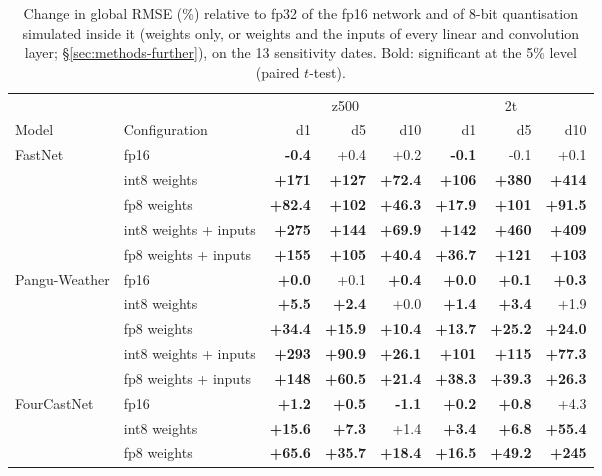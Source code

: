 \begin{table}[tbp]
\centering
\scriptsize
\setlength{\tabcolsep}{3pt}
\caption{Change in global RMSE (\%) relative to fp32 of the fp16 network and of 8-bit quantisation simulated inside it (weights only, or weights and the inputs of every linear and convolution layer; \S\ref{sec:methods-further}), on the 13 sensitivity dates. Bold: significant at the 5\% level (paired $t$-test).}
\label{tab:eightbit}
\begin{tabular}{llrrrrrr}
\toprule
 & & \multicolumn{3}{c}{z500} & \multicolumn{3}{c}{2t} \\
Model & Configuration & d1 & d5 & d10 & d1 & d5 & d10 \\
\midrule
FastNet & fp16 & \textbf{-0.4} & +0.4 & +0.2 & \textbf{-0.1} & -0.1 & +0.1 \\
 & int8 weights & \textbf{+171} & \textbf{+127} & \textbf{+72.4} & \textbf{+106} & \textbf{+380} & \textbf{+414} \\
 & fp8 weights & \textbf{+82.4} & \textbf{+102} & \textbf{+46.3} & \textbf{+17.9} & \textbf{+101} & \textbf{+91.5} \\
 & int8 weights + inputs & \textbf{+275} & \textbf{+144} & \textbf{+69.9} & \textbf{+142} & \textbf{+460} & \textbf{+409} \\
 & fp8 weights + inputs & \textbf{+155} & \textbf{+105} & \textbf{+40.4} & \textbf{+36.7} & \textbf{+121} & \textbf{+103} \\
\midrule
Pangu-Weather & fp16 & \textbf{+0.0} & +0.1 & \textbf{+0.4} & \textbf{+0.0} & \textbf{+0.1} & \textbf{+0.3} \\
 & int8 weights & \textbf{+5.5} & \textbf{+2.4} & +0.0 & \textbf{+1.4} & \textbf{+3.4} & +1.9 \\
 & fp8 weights & \textbf{+34.4} & \textbf{+15.9} & \textbf{+10.4} & \textbf{+13.7} & \textbf{+25.2} & \textbf{+24.0} \\
 & int8 weights + inputs & \textbf{+293} & \textbf{+90.9} & \textbf{+26.1} & \textbf{+101} & \textbf{+115} & \textbf{+77.3} \\
 & fp8 weights + inputs & \textbf{+148} & \textbf{+60.5} & \textbf{+21.4} & \textbf{+38.3} & \textbf{+39.3} & \textbf{+26.3} \\
\midrule
FourCastNet & fp16 & \textbf{+1.2} & \textbf{+0.5} & \textbf{-1.1} & \textbf{+0.2} & \textbf{+0.8} & +4.3 \\
 & int8 weights & \textbf{+15.6} & \textbf{+7.3} & +1.4 & \textbf{+3.4} & \textbf{+6.8} & \textbf{+55.4} \\
 & fp8 weights & \textbf{+65.6} & \textbf{+35.7} & \textbf{+18.4} & \textbf{+16.5} & \textbf{+49.2} & \textbf{+245} \\

\end{tabular}
\end{table}
